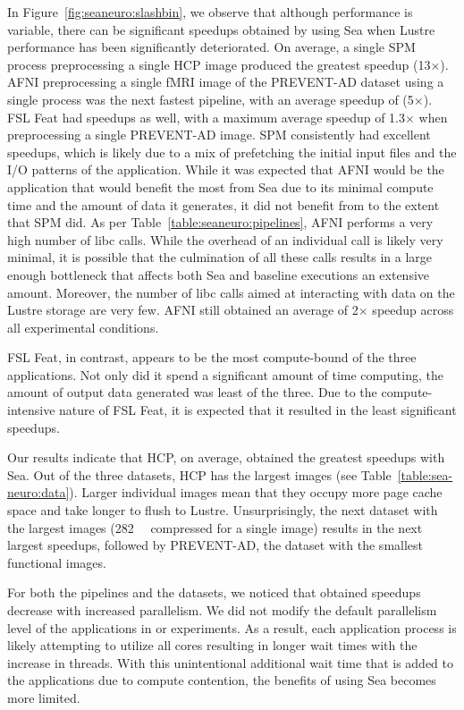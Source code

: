 In Figure~\ref{fig:seaneuro:slashbin}, we observe that although performance is
variable, there can be significant speedups obtained by using Sea when Lustre
performance has been significantly deteriorated. On average, a single SPM
process preprocessing a single HCP image produced the greatest speedup
(13$\times$). AFNI preprocessing a single fMRI image of the PREVENT-AD dataset
using a single process was the next fastest pipeline, with an average speedup of
(5$\times$). FSL Feat had speedups as well, with a maximum average speedup of
1.3$\times$ when preprocessing a single PREVENT-AD image. SPM consistently had
excellent speedups, which is likely due to a mix of prefetching the initial
input files and the I/O patterns of the application. While it was expected that
AFNI would be the application that would benefit the most from Sea due to its
minimal compute time and the amount of data it generates, it did not benefit
from to the extent that SPM did. As per Table~\ref{table:seaneuro:pipelines},
AFNI performs a very high number of libc calls. While the overhead of an
individual call is likely very minimal, it is possible that the culmination of
all these calls results in a large enough bottleneck that affects both Sea and
baseline executions an extensive amount. Moreover, the number of libc calls
aimed at interacting with data on the Lustre storage are very few. AFNI still
obtained an average of 2$\times$ speedup across all experimental conditions.

FSL Feat, in contrast, appears to be the most compute-bound of the three
applications. Not only did it spend a significant amount of time computing, the
amount of output data generated was least of the three. Due to the
compute-intensive nature of FSL Feat, it is expected that it resulted in the
least significant speedups.

Our results indicate that HCP, on average, obtained the greatest speedups with
Sea. Out of the three datasets, HCP has the largest images (see
Table~\ref{table:sea-neuro:data}). Larger individual images mean that they
occupy more page cache space and take longer to flush to Lustre. Unsurprisingly,
the next dataset with the largest images (\SI{282}{\mebi\byte} compressed for a
single image) results in the next largest speedups, followed by PREVENT-AD, the
dataset with the smallest functional images.

For both the pipelines and the datasets, we noticed that obtained speedups
decrease with increased parallelism. We did not modify the default parallelism
level of the applications in or experiments. As a result, each application
process is likely attempting to utilize all cores resulting in longer wait times
with the increase in threads. With this unintentional additional wait time that
is added to the applications due to compute contention, the benefits of using
Sea becomes more limited.


